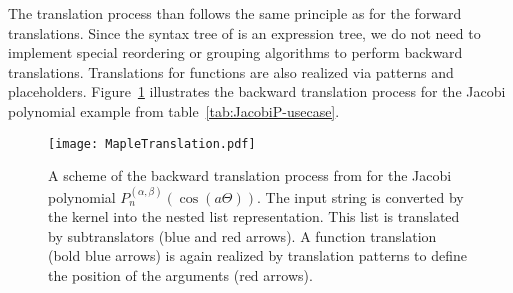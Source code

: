 The translation process than follows the same principle as for the forward translations. Since the syntax tree of \Maple{} is an expression tree, we do not need to implement special reordering or grouping algorithms to perform backward translations. Translations for functions are also realized via patterns and placeholders. Figure~\ref{fig:backward-trans} illustrates the backward translation process for the Jacobi polynomial example from table~\ref{tab:JacobiP-usecase}.

\begin{figure}[!htp]
	\centering
	\texttt{[image: MapleTranslation.pdf]}
	\caption{A scheme of the backward translation process from \Maple{} for the Jacobi polynomial $P_n^{(\alpha , \beta)}(\cos(a\Theta))$. The input string is converted by the \Maple{} kernel into the nested list representation. This list is translated by subtranslators (blue and red arrows). A function translation (bold blue arrows) is again realized by translation patterns to define the position of the arguments (red arrows).}
	\label{fig:backward-trans}
\end{figure}